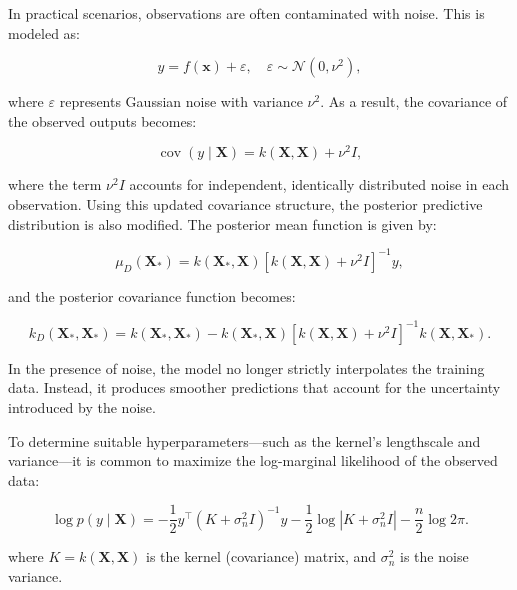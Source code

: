 \documentclass{ut-thesis}
\begin{document}
\newpage
In practical scenarios, observations are often contaminated with noise. This is modeled as:

\begin{equation}
    y = f(\mathbf{x}) + \varepsilon, \quad \varepsilon \sim \mathcal{N}(0, \nu^2),
\end{equation}

where \( \varepsilon \) represents Gaussian noise with variance \( \nu^2 \). As a result, the covariance of the observed outputs becomes:

\begin{equation}
    \operatorname{cov}(y \mid \mathbf{X}) = k(\mathbf{X}, \mathbf{X}) + \nu^2 I,
\end{equation}

where the term \( \nu^2 I \) accounts for independent, identically distributed noise in each observation. Using this updated covariance structure, the posterior predictive distribution is also modified. The posterior mean function is given by:

\begin{equation}
    \mu_D(\mathbf{X_*}) = k(\mathbf{X_*}, \mathbf{X}) \left[k(\mathbf{X}, \mathbf{X}) + \nu^2 I\right]^{-1} y,
\end{equation}

and the posterior covariance function becomes:

\begin{equation}
    k_D(\mathbf{X_*}, \mathbf{X_*}) = k(\mathbf{X_*}, \mathbf{X_*}) - k(\mathbf{X_*}, \mathbf{X}) \left[k(\mathbf{X}, \mathbf{X}) + \nu^2 I\right]^{-1} k(\mathbf{X}, \mathbf{X_*}).
\end{equation}

In the presence of noise, the model no longer strictly interpolates the training data. Instead, it produces smoother predictions that account for the uncertainty introduced by the noise.

To determine suitable hyperparameters—such as the kernel's lengthscale and variance—it is common to maximize the log-marginal likelihood of the observed data:

\begin{equation}
    \log p(y \mid \mathbf{X}) = -\frac{1}{2} y^{\top} (K + \sigma_n^2 I)^{-1} y - \frac{1}{2} \log \left|K + \sigma_n^2 I\right| - \frac{n}{2} \log 2\pi.
\end{equation}

\noindent
where \( K = k(\mathbf{X}, \mathbf{X}) \) is the kernel (covariance) matrix, and \( \sigma_n^2 \) is the noise variance.
\end{document}
